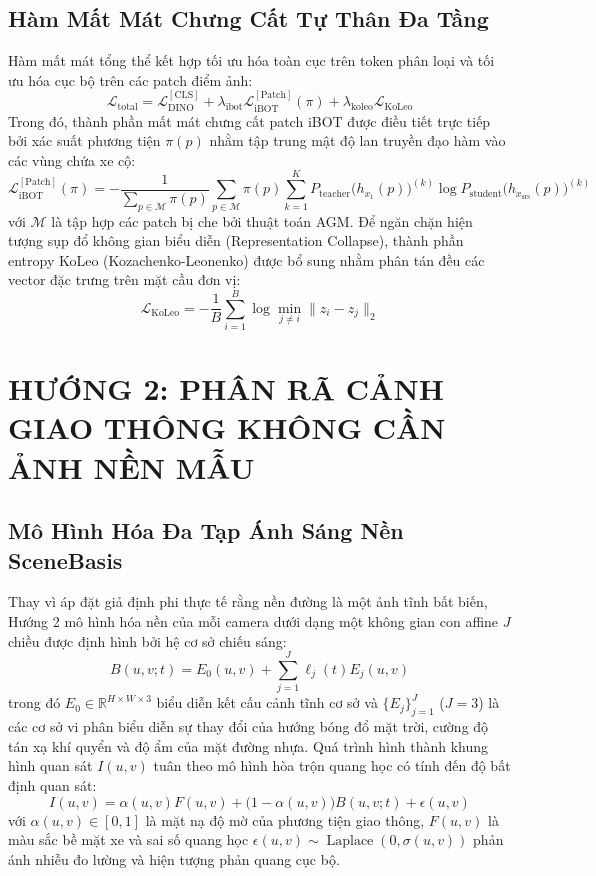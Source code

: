 \documentclass[11pt,a4paper]{article}
\begin{document}
\subsection{Hàm Mất Mát Chưng Cất Tự Thân Đa Tầng}
Hàm mất mát tổng thể kết hợp tối ưu hóa toàn cục trên token phân loại và tối ưu hóa cục bộ trên các patch điểm ảnh:
\begin{equation}
    \mathcal{L}_{\text{total}} = \mathcal{L}_{\text{DINO}}^{[\text{CLS}]} + \lambda_{\text{ibot}} \mathcal{L}_{\text{iBOT}}^{[\text{Patch}]}(\pi) + \lambda_{\text{koleo}} \mathcal{L}_{\text{KoLeo}}
\end{equation}
Trong đó, thành phần mất mát chưng cất patch iBOT được điều tiết trực tiếp bởi xác suất phương tiện $\pi(p)$ nhằm tập trung mật độ lan truyền đạo hàm vào các vùng chứa xe cộ:
\begin{equation}
    \mathcal{L}_{\text{iBOT}}^{[\text{Patch}]}(\pi) = - \frac{1}{\sum_{p \in \mathcal{M}} \pi(p)} \sum_{p \in \mathcal{M}} \pi(p) \sum_{k=1}^K P_{\text{teacher}}\big(h_{x_1}(p)\big)^{(k)} \log P_{\text{student}}\big(h_{x_{\text{srs}}}(p)\big)^{(k)}
\end{equation}
với $\mathcal{M}$ là tập hợp các patch bị che bởi thuật toán AGM. Để ngăn chặn hiện tượng sụp đổ không gian biểu diễn (Representation Collapse), thành phần entropy KoLeo (Kozachenko-Leonenko) được bổ sung nhằm phân tán đều các vector đặc trưng trên mặt cầu đơn vị:
\begin{equation}
    \mathcal{L}_{\text{KoLeo}} = - \frac{1}{B} \sum_{i=1}^B \log \min_{j \ne i} \|z_i - z_j\|_2
\end{equation}

\section{HƯỚNG 2: PHÂN RÃ CẢNH GIAO THÔNG KHÔNG CẦN ẢNH NỀN MẪU}

\subsection{Mô Hình Hóa Đa Tạp Ánh Sáng Nền SceneBasis}
Thay vì áp đặt giả định phi thực tế rằng nền đường là một ảnh tĩnh bất biến, Hướng 2 mô hình hóa nền của mỗi camera dưới dạng một không gian con affine $J$ chiều được định hình bởi hệ cơ sở chiếu sáng:
\begin{equation}
    B(u, v; t) = E_0(u, v) + \sum_{j=1}^J \ell_j(t) E_j(u, v)
\end{equation}
trong đó $E_0 \in \mathbb{R}^{H \times W \times 3}$ biểu diễn kết cấu cảnh tĩnh cơ sở và $\{E_j\}_{j=1}^J$ ($J = 3$) là các cơ sở vi phân biểu diễn sự thay đổi của hướng bóng đổ mặt trời, cường độ tán xạ khí quyển và độ ẩm của mặt đường nhựa.
Quá trình hình thành khung hình quan sát $I(u, v)$ tuân theo mô hình hòa trộn quang học có tính đến độ bất định quan sát:
\begin{equation}
    I(u, v) = \alpha(u, v) F(u, v) + \big(1 - \alpha(u, v)\big) B(u, v; t) + \epsilon(u, v)
\end{equation}
với $\alpha(u, v) \in [0, 1]$ là mặt nạ độ mờ của phương tiện giao thông, $F(u, v)$ là màu sắc bề mặt xe và sai số quang học $\epsilon(u, v) \sim \operatorname{Laplace}(0, \sigma(u, v))$ phản ánh nhiễu đo lường và hiện tượng phản quang cục bộ.
\end{document}
